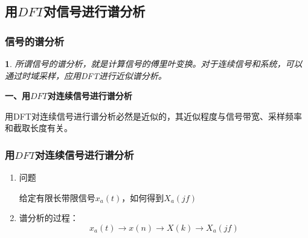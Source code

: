 \documentclass[notheorems,compress,mathserif,table]{beamer}
\newtheorem{dablock}{}
\begin{document}
\subsection{用$DFT$对信号进行谱分析}
\begin{frame}[shrink]\frametitle{信号的谱分析}%
\begin{dablock}
所谓信号的谱分析，就是计算信号的傅里叶变换。对于连续信号和系统，可以通过时域采样，应用DFT进行近似谱分析。
\end{dablock}


\textbf{一、用$DFT$对连续信号进行谱分析}

   用DFT对连续信号进行谱分析必然是近似的，其近似程度与信号带宽、采样频率和截取长度有关。

\end{frame}



\begin{frame}[shrink]\frametitle{用$DFT$对连续信号进行谱分析}%

\begin{enumerate}
  \item [(1)]  问题 \par
        给定有限长带限信号$x_a(t)$，如何得到$X_a(jf)$\newline


  \item [(2)]   谱分析的过程：
        $$x_a(t) \longrightarrow  x(n) \longrightarrow X(k) \longrightarrow X_a(jf)$$
\end{enumerate}
\end{frame}


%
\end{document}
